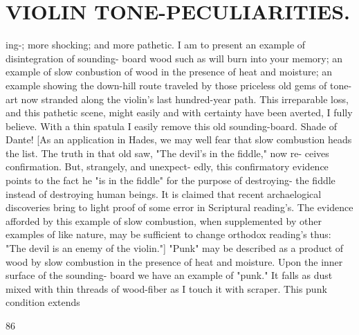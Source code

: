 \documentclass{article}
\begin{document}
\section*{VIOLIN TONE-PECULIARITIES.}
ing-; more shocking; and more pathetic. I am to present an example of disintegration of sounding- board wood such as will burn into your memory; an example of slow conbustion of wood in the presence of heat and moisture; an example showing the down-hill route traveled by those priceless old gems of tone-art now stranded along the violin's last hundred-year path. This irreparable loss, and this pathetic scene, might easily and with certainty have been averted, I fully believe. With a thin spatula I easily remove this old sounding-board. Shade of Dante! [As an application in Hades, we may well fear that slow combustion heads the list. The truth in that old saw, "The devil's in the fiddle," now re- ceives confirmation. But, strangely, and unexpect- edly, this confirmatory evidence points to the fact he "is in the fiddle" for the purpose of destroying- the fiddle instead of destroying human beings. It is claimed that recent archaelogical discoveries bring to light proof of some error in Scriptural reading's. The evidence afforded by this example of slow combustion, when supplemented by other examples of like nature, may be sufficient to change orthodox reading's thus: "The devil is an enemy of the violin."] "Punk" may be described as a product of wood by slow combustion in the presence of heat and moisture. Upon the inner surface of the sounding- board we have an example of "punk." It falls as dust mixed with thin threads of wood-fiber as I touch it with scraper. This punk condition extends

86
\end{document}

